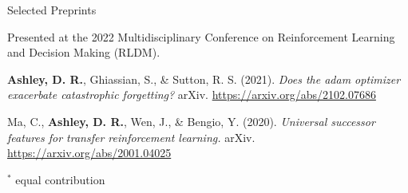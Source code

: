 \documentclass{cv}
\begin{document}
\begin{rSection}{Selected Preprints}
\begin{rPublications}
        \vspace{-0.4em} Presented at the 2022 Multidisciplinary Conference on Reinforcement Learning and Decision Making (RLDM).
    \item
        \textbf{Ashley, D. R.}, Ghiassian, S., \& Sutton, R. S.
        (2021).
        \textit{Does the adam optimizer exacerbate catastrophic forgetting?}
        arXiv.
        \url{https://arxiv.org/abs/2102.07686}
    \item
        Ma, C., \textbf{Ashley, D. R.}, Wen, J., \& Bengio, Y.
        (2020).
        \textit{Universal successor features for transfer reinforcement learning.}
        arXiv.
        \url{https://arxiv.org/abs/2001.04025}
\end{rPublications}

\vspace{-0.4em} \hfill $^*$ \footnotesize{equal contribution} \vspace{-1em}

\end{rSection}

\end{document}
